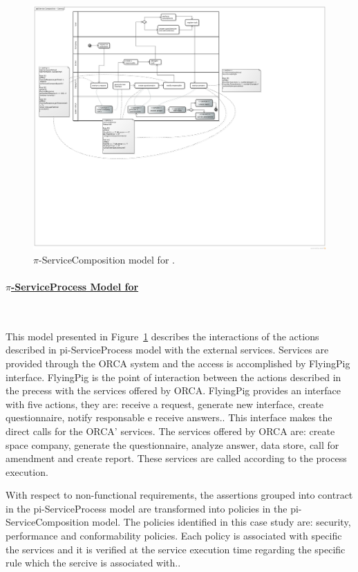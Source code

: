 \begin{figure}
\centering
\includegraphics[width=1.0\textwidth]{figs/ServiceCompositionGeneral.png}
\caption{$\pi$-ServiceComposition model for \FlyingPig.\label{fig:PiServiceCompositionModel}}
\end{figure}

\paragraph{\underline{$\pi$-ServiceProcess Model for \FlyingPig}}~

This model presented in Figure~\ref{fig:PiServiceCompositionModel} describes the interactions of the actions described in pi-ServiceProcess model with the external services. Services are provided through the ORCA system and the access is accomplished by FlyingPig interface. FlyingPig is the point of interaction between the actions described in the precess with the services offered by ORCA. FlyingPig provides an interface with five actions, they are: receive a request, generate new interface, create questionnaire, notify responsable e receive answers.. This interface makes the direct calls for the ORCA' services. The services offered by ORCA are: create space company, generate the questionnaire, analyze answer, data store, call for amendment and create report. These services are called according to the process execution.

With respect to non-functional requirements, the assertions grouped into contract in the pi-ServiceProcess model are transformed into policies in the pi-ServiceComposition model. The policies identified in this case study are: security, performance and conformability policies. Each policy is associated with specific the services and it is verified at the service execution time regarding the specific rule which the sercive is associated with..



